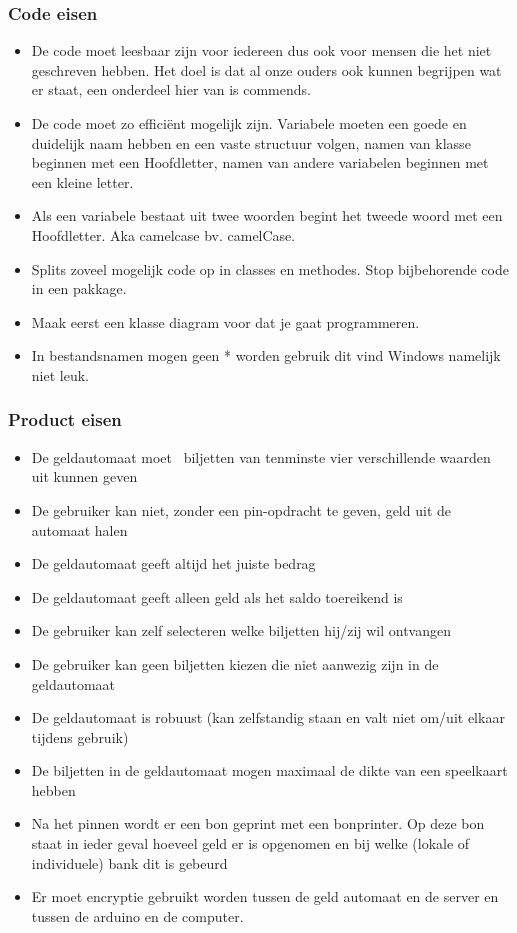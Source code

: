 \documentclass{article}
\begin{document}
\subsubsection{Code eisen}
\begin{itemize}
\item De code moet leesbaar zijn voor iedereen dus ook voor mensen die het niet geschreven hebben. Het doel is dat al onze ouders ook kunnen begrijpen wat er staat, een onderdeel hier van is
 commends.
\item De code moet zo efficiënt mogelijk zijn.
Variabele moeten een goede en duidelijk naam hebben en een vaste structuur volgen, namen van klasse beginnen met een Hoofdletter, namen van andere variabelen beginnen met een kleine letter.
        \item Als een variabele bestaat uit twee woorden begint het tweede woord met een Hoofdletter. Aka camelcase bv. camelCase.
        \item Splits zoveel mogelijk code op in classes en methodes. Stop bijbehorende code in een pakkage.
        \item Maak eerst een klasse diagram voor dat je gaat programmeren.
        \item In bestandsnamen mogen geen * worden gebruik dit vind Windows namelijk niet leuk.
\end{itemize}

\subsubsection{Product eisen}
\begin{itemize}
        \item De geldautomaat moet  biljetten van tenminste vier verschillende waarden uit kunnen geven
        \item De gebruiker kan niet, zonder een pin-opdracht te geven, geld uit de automaat halen
        \item De geldautomaat geeft altijd het juiste bedrag
        \item De geldautomaat geeft alleen geld als het saldo toereikend is
        \item De gebruiker kan zelf selecteren welke biljetten hij/zij wil ontvangen
        \item De gebruiker kan geen biljetten kiezen die niet aanwezig zijn in de geldautomaat
        \item De geldautomaat is robuust (kan zelfstandig staan en valt niet om/uit elkaar tijdens gebruik)
        \item De biljetten in de geldautomaat mogen maximaal de dikte van een speelkaart hebben
        \item Na het pinnen wordt er een bon geprint met een bonprinter. Op deze bon staat in ieder geval hoeveel geld er is opgenomen en bij welke (lokale of individuele) bank dit is gebeurd
        \item Er moet encryptie gebruikt worden tussen de geld automaat en de server en tussen de arduino en de computer.
\end{itemize}
\end{document}
